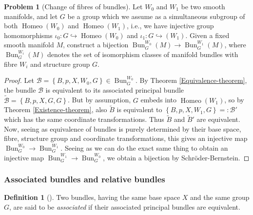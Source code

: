 \documentclass[reqno]{amsart}
\theoremstyle{definition}
\newtheorem{definition}[theorem]{Definition}
\newtheorem{problem}[theorem]{Problem}
\theoremstyle{remark}
\DeclareMathOperator{\Homeo}{Homeo}
\DeclareMathOperator{\Bun}{Bun}
\begin{document}
    \begin{problem}[Change of fibres of bundles]
        Let $W_0$ and $W_1$ be two smooth manifolds, and
        let $G$ be a group which we assume as a simultaneous
        subgroup of both $\Homeo (W_0)$ and
        $\Homeo(W_1)$, i.e., we have injective group homomorphisms
        $\iota_0 \colon G \hookrightarrow
        \Homeo(W_0)$ and
        $\iota_1 \colon G \hookrightarrow (W_1)$. Given a
        fixed smooth manifold $M$, construct a bijection
        $\Bun_G^{W_0}(M) \to \Bun_G^{W_1}(M)$, where
        $\Bun_G^{W_i}(M)$ denotes the set of
        isomorphism classes of manifold bundles with fibre
        $W_i$ and structure group $G$.
    \end{problem}

    \begin{proof}
        Let
        $\mathcal{B} = \left\{ B,p,X,W_0,G \right\} 
        \in \Bun_G^{W_0}$.
        By Theorem \ref{Equivalence-theorem}, the
        bundle $\mathcal{B}$ is equivalent
        to its associated principal bundle
        $\tilde{\mathcal{B}} = 
        \left\{ B,p,X,G,G \right\} $. But by
        assumption, $G$ embeds into
        $\Homeo(W_1)$, so by Theorem 
        \ref{Existence-theorem}, also
        $\tilde{B}$ is equivalent to
        $\left\{ B,p,X,W_1,G \right\} =:
        \mathcal{B}'$ which has the
        same coordinate transformations. Thus
        $\tilde{B}$ and $\tilde{B}'$ are equivalent.
        Now, seeing as equivalence of bundles is purely determined
        by their base space, fibre, structure group and
        coordinate transformations,
        this gives an injective map
        $\Bun_G^{W_0} \to \Bun_G^{W_1}$. Seeing
        as we can do the exact same thing to obtain an
        injective map
        $\Bun_{G}^{W_1} \to \Bun_G^{W_0}$, we obtain
        a bijection by Schröder-Bernstein.
    \end{proof}

    \subsubsection{Associated bundles and relative bundles}

    \begin{definition}[]
        Two bundles, having the same base space
        $X$ and the same group $G$, are said to be
        \textit{associated} if their associated 
        principal bundles are equivalent.
    \end{definition}
\end{document}
